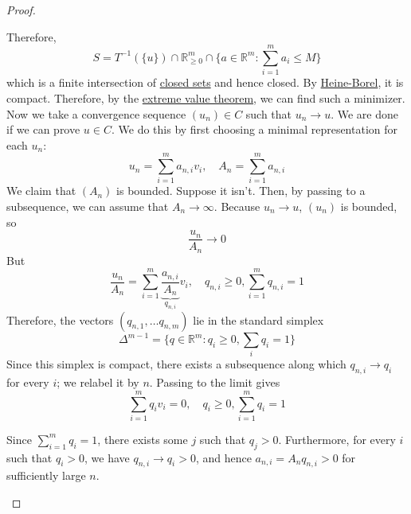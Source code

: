 \begin{proof}
\begin{enumerate}
\begin{enumerate}
						Therefore, 
						\begin{equation}
							S = T^{-1}(\{u\}) \cap \mathbb{R}^m_{\geq 0} \cap \bigg\{ a \in \mathbb{R}^m \colon \sum_{i=1}^m a_i \leq M \bigg\}
						\end{equation}
						which is a finite intersection of \hyperref[pst-def:closed]{closed sets} and hence closed. By \hyperref[real-thm:heine-borel]{Heine-Borel}, it is compact. Therefore, by the \hyperref[real-thm:extreme-value-theorem]{extreme value theorem}, we can find such a minimizer. Now we take a convergence sequence $(u_n) \in C$ such that $u_n \to u$. We are done if we can prove $u \in C$. We do this by first choosing a minimal representation for each $u_n$: 
						\begin{equation}
							u_n = \sum_{i=1}^m a_{n, i} v_i, \quad A_n = \sum_{i=1}^m a_{n, i}
						\end{equation}
						We claim that $(A_n)$ is bounded. Suppose it isn't. Then, by passing to a subsequence, we can assume that $A_n \to \infty$. Because $u_n \to u$, $(u_n)$ is bounded, so 
						\begin{equation}
							\frac{u_n}{A_n} \to 0 
						\end{equation}
						But 
						\begin{equation}
							\frac{u_n}{A_n} = \sum_{i=1}^m \underbrace{\frac{a_{n, i}}{A_n}}_{q_{n, i}} v_i, \quad q_{n, i} \geq 0, \sum_{i=1}^m q_{n, i} = 1
						\end{equation}
						Therefore, the vectors $(q_{n, 1}, \ldots q_{n, m})$ lie in the standard simplex 
						\begin{equation}
							\Delta^{m-1} = \bigg\{ q \in \mathbb{R}^m \colon q_i \geq 0, \sum_i q_i = 1 \bigg\}
						\end{equation}
						Since this simplex is compact, there exists a subsequence along which $q_{n, i} \to q_i$ for every $i$; we relabel it by $n$. Passing to the limit gives 
						\begin{equation}
							\sum_{i=1}^m q_i v_i = 0, \quad q_i \geq 0, \sum_{i=1}^m q_i = 1
						\end{equation}

						Since $\sum_{i=1}^m q_i = 1$, there exists some $j$ such that $q_j > 0$. Furthermore, for every $i$ such that $q_i > 0$, we have $q_{n,i} \to q_i > 0$, and hence $a_{n,i} = A_n q_{n,i} > 0$ for sufficiently large $n$.


\end{enumerate}
\end{enumerate}
\end{proof}
